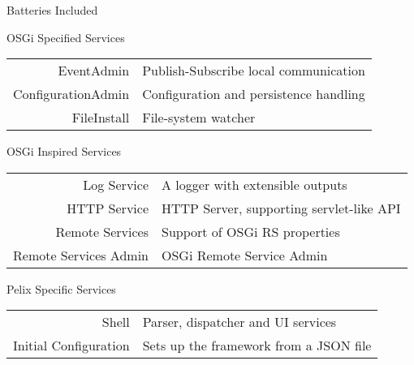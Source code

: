 \begin{frame}{Batteries Included}
\begin{block}{OSGi Specified Services}
\begin{small}
\begin{tabular}{rl}
EventAdmin & Publish-Subscribe local communication \\
ConfigurationAdmin & Configuration and persistence handling \\
FileInstall & File-system watcher \\
\end{tabular}
\end{small}
\end{block}

\begin{block}{OSGi Inspired Services}
\begin{small}
\begin{tabular}{rl}
Log Service & A logger with extensible outputs \\
HTTP Service & HTTP Server, supporting servlet-like API \\
Remote Services & Support of OSGi RS properties \\
Remote Services Admin & OSGi Remote Service Admin \\
\end{tabular}
\end{small}
\end{block}

\begin{block}{Pelix Specific Services}
\begin{small}
\begin{tabular}{rl}
Shell & Parser, dispatcher and UI services \\
Initial Configuration & Sets up the framework from a JSON file \\
\end{tabular}
\end{small}
\end{block}
\end{frame}
